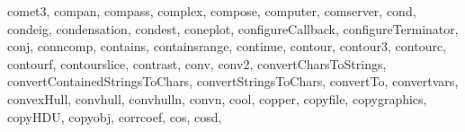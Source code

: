 {{        comet3,%
        compan,%
        compass,%
        complex,%
        compose,%
        computer,%
        comserver,%
        cond,%
        condeig,%
        condensation,%
        condest,%
        coneplot,%
        configureCallback,%
        configureTerminator,%
        conj,%
        conncomp,%
        contains,%
        containsrange,%
        continue,%
        contour,%
        contour3,%
        contourc,%
        contourf,%
        contourslice,%
        contrast,%
        conv,%
        conv2,%
        convertCharsToStrings,%
        convertContainedStringsToChars,%
        convertStringsToChars,%
        convertTo,%
        convertvars,%
        convexHull,%
        convhull,%
        convhulln,%
        convn,%
        cool,%
        copper,%
        copyfile,%
        copygraphics,%
        copyHDU,%
        copyobj,%
        corrcoef,%
        cos,%
        cosd,%
}}
